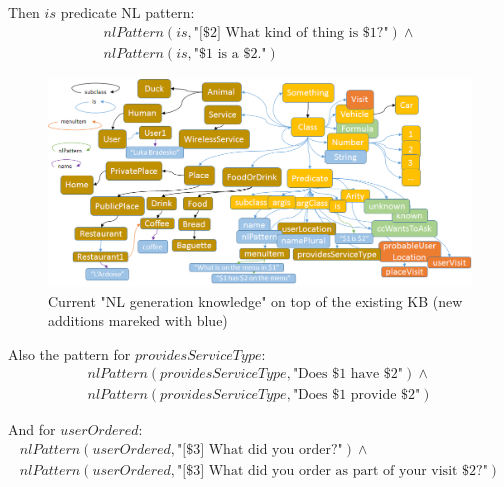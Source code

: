 Then $is$ predicate NL pattern:
\begin{equation}\label{as:nl:is}
\begin{gathered}
    nlPattern(is,\text{"[\$2] What kind of thing is \$1?"}) \land \\
    nlPattern(is,\text{"\$1 is a \$2."})
\end{gathered}
\end{equation}

\begin{figure}[H]
	\centering
		\includegraphics[width=1\textwidth]{figures/LogicToNLOntology.png}
	\caption{Current "NL generation knowledge" on top of the existing KB (new
    additions mareked with blue)}
	\label{fig:nlKB}
\end{figure}

Also the pattern for $providesServiceType$:
\begin{equation}\label{as:nl:providesServiceType}
\begin{gathered}
    nlPattern(providesServiceType,\text{"Does \$1 have \$2"}) \land \\
    nlPattern(providesServiceType,\text{"Does \$1 provide \$2"})
\end{gathered}
\end{equation}

And for $userOrdered$:
\begin{equation}\label{as:nl:userOrdered}
\begin{gathered}
    nlPattern(userOrdered,\text{"[\$3] What did you order?"}) \land \\
    nlPattern(userOrdered,\text{"[\$3] What did you order as part of your visit \$2?"}) \\
\end{gathered}
\end{equation}


